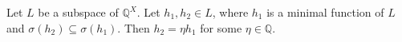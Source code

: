 Let $L$ be a subspace of $\mathbb{Q}^X$. Let $h_1, h_2 \in L$, where $h_1$ is a minimal function of $L$ and $\sigma(h_2) \subseteq \sigma(h_1)$. Then $h_2 = \eta h_1$ for some $\eta \in \mathbb{Q}$.
